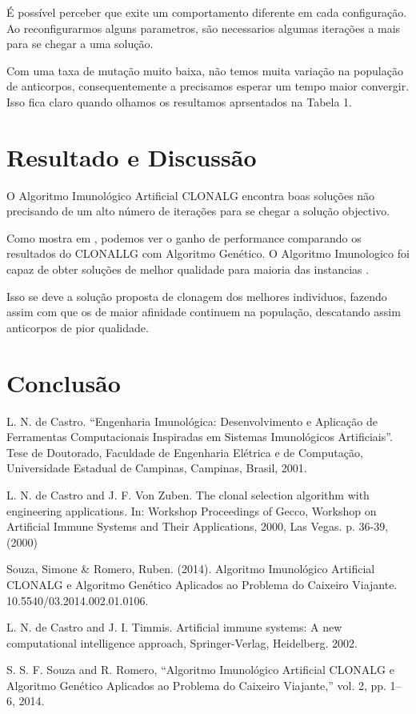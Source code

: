\documentclass[conference]{IEEEtran}
\begin{document}
    É possível perceber que exite um comportamento diferente em cada configuração. Ao reconfigurarmos alguns parametros, são necessarios algumas iterações a mais para se chegar a uma solução. 
    
    Com uma taxa de mutação muito baixa, não temos muita variação na população de anticorpos, consequentemente a precisamos esperar um tempo maior convergir. Isso fica claro quando olhamos os resultamos aprsentados na Tabela 1.
    
 
\section{Resultado e Discussão}

   O Algoritmo Imunológico Artificial CLONALG encontra boas soluções não precisando de um alto número de iterações para se chegar a solução objectivo. 
   
   Como mostra em \cite{SS}, podemos ver o ganho de performance comparando os resultados do CLONALLG com Algoritmo Genético. O Algoritmo Imunologico foi capaz de obter soluções de melhor qualidade para maioria das instancias \cite{SS}.
   
   Isso se deve a solução proposta de clonagem dos melhores individuos, fazendo assim com que os de maior afinidade continuem na população, descatando assim anticorpos de pior qualidade.
   
\section*{Conclusão}


\begin{thebibliography}{00}

 L.  N.  de  Castro.  “Engenharia  Imunológica:  Desenvolvimento  e  Aplicação  de  Ferramentas Computacionais  Inspiradas  em  Sistemas  Imunológicos  Artificiais”.  Tese  de  Doutorado,  Faculdade  de Engenharia Elétrica e de Computação, Universidade Estadual de Campinas, Campinas, Brasil, 2001.

 L. N. de Castro and J. F. Von Zuben.  The clonal selection algorithm with engineering applications. In: Workshop Proceedings of Gecco, Workshop on Artificial Immune Systems and Their Applications, 2000, Las Vegas. p. 36-39, (2000)

 Souza, Simone & Romero, Ruben. (2014). Algoritmo Imunológico Artificial CLONALG e Algoritmo Genético Aplicados ao Problema do Caixeiro Viajante. 10.5540/03.2014.002.01.0106. 

 L. N. de Castro and J. I. Timmis. Artificial immune systems: A new computational intelligence approach, Springer-Verlag, Heidelberg. 2002.

 S. S. F. Souza and R. Romero, “Algoritmo Imunológico Artificial CLONALG e Algoritmo Genético Aplicados ao Problema do Caixeiro Viajante,” vol. 2, pp. 1–6, 2014.
\end{thebibliography}
\end{document}
